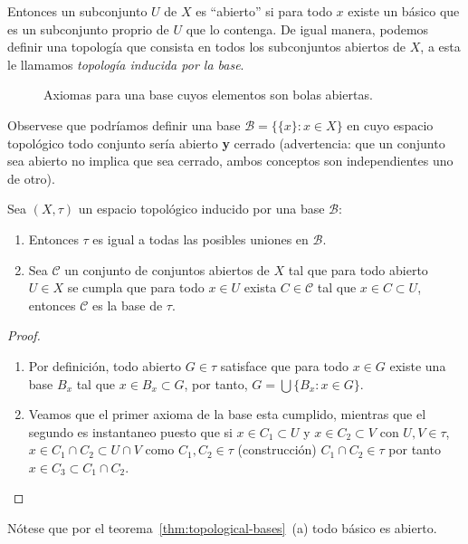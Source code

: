 \documentclass[11pt,oneside,a4paper]{book}
\begin{document}
Entonces un subconjunto $U$ de $X$ es ``abierto'' si para todo $x$ existe un básico que es un subconjunto proprio de $U$ que lo contenga. De igual manera, podemos definir una topología que consista en todos los subconjuntos abiertos de $X$, a esta le llamamos \textit{topología inducida por la base}.
\begin{figure}
\centering
{}
\caption{Axiomas para una base cuyos elementos son bolas abiertas.}
\end{figure}

Observese que podríamos definir una base $\mathcal{B}=\{\{x\}:x\in X\}$ en cuyo espacio topológico todo conjunto sería abierto \textbf{y} cerrado (advertencia: que un conjunto sea abierto no implica que sea cerrado, ambos conceptos son independientes uno de otro).
\begin{thm}\label{thm:topological-bases}
Sea $(X,\tau)$ un espacio topológico inducido por una base $\mathcal{B}$:
\begin{enumerate}[$a$)]
\item Entonces $\tau$ es igual a todas las posibles uniones en $\mathcal{B}$.
\item Sea $\mathcal{C}$ un conjunto de conjuntos abiertos de $X$ tal que para todo abierto $U\in X$ se cumpla que para todo $x\in U$ exista $C\in\mathcal{C}$ tal que $x\in C\subset U$, entonces $\mathcal{C}$ es la base de $\tau$.
\end{enumerate}
\end{thm}
\begin{proof}
\begin{enumerate}[$a$)]
\item Por definición, todo abierto $G\in\tau$ satisface que para todo $x\in G$ existe una base $B_x$ tal que $x\in B_x\subset G$, por tanto, $G=\bigcup\{B_x:x\in G\}$.
\item Veamos que el primer axioma de la base esta cumplido, mientras que el segundo es instantaneo puesto que si $x\in C_1\subset U$ y $x\in C_2\subset V$ con $U,V\in\tau$, $x\in C_1\cap C_2\subset U\cap V$ como $C_1,C_2\in\tau$ (construcción) $C_1\cap C_2\in\tau$ por tanto $x\in C_3\subset C_1\cap C_2$.
\end{enumerate}
\end{proof}
Nótese que por el teorema~\ref{thm:topological-bases}~(a) todo básico es abierto.
\end{document}
